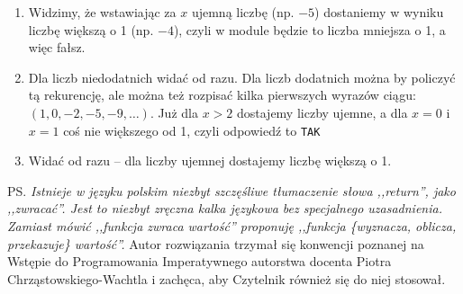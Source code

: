 \begin{solutions}
    \begin{enumerate}[\bf A.]
        \item Widzimy, że wstawiając za $x$ ujemną liczbę (np. $-5$) dostaniemy w wyniku liczbę większą o 1 (np. $-4$), czyli w module będzie to liczba mniejsza o 1, a więc fałsz.

        \item Dla liczb niedodatnich widać od razu. Dla liczb dodatnich można by policzyć tą rekurencję, ale można też rozpisać kilka pierwszych wyrazów ciągu: $(1,0,-2,-5,-9,\ldots)$. Już dla $x>2$ dostajemy liczby ujemne, a dla $x=0$ i $x=1$ coś nie większego od 1, czyli odpowiedź to \texttt{TAK}

        \item Widać od razu -- dla liczby ujemnej dostajemy liczbę większą o 1.
    \end{enumerate}

    PS. \textit{Istnieje w języku polskim niezbyt szczęśliwe tłumaczenie słowa ,,return'', jako ,,zwracać''. Jest to niezbyt zręczna kalka językowa bez specjalnego uzasadnienia. Zamiast mówić ,,funkcja zwraca wartość'' proponuję ,,funkcja \{wyznacza, oblicza, przekazuje\} wartość''.} Autor rozwiązania trzymał się konwencji poznanej na Wstępie do Programowania Imperatywnego autorstwa docenta Piotra Chrząstowskiego-Wachtla i zachęca, aby Czytelnik również się do niej stosował.
\end{solutions}
